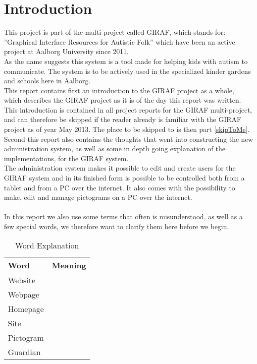\chapter{Introduction}
This project is part of the multi-project called GIRAF, which stands for: ''Graphical Interface Resources for Autistic Folk'' which have been an active project at Aalborg University since 2011.\\
As the name suggests this system is a tool made for helping kids with autism to communicate. The system is to be actively used in the specialized kinder gardens and schools here in Aalborg.\\
This report contains first an introduction to the GIRAF project as a whole, which describes the GIRAF project as it is of the day this report was written. This introduction is contained in all project reports for the GIRAF multi-project, and can therefore be skipped if the reader already is familiar with the GIRAF project as of year May 2013. The place to be skipped to is then part \vref{skipToMe}.\\
Second this report also contains the thoughts that went into constructing the new administration system, as well as some in depth going explanation of the implementations, for the GIRAF system.\\
The administration system makes it possible to edit and create users for the GIRAF system and in its finished form is possible to be controlled both from a tablet and from a PC over the internet. It also comes with the possibility to make, edit and manage pictograms on a PC over the internet.\\
\\
In this report we also use some terms that often is misunderstood, as well as a few special words, we therefore want to clarify them here before we begin.


\begin{table}[htbp]
	\centering
		\begin{tabular}{|l|l|}
			\hline
			Word & Meaning\\\hline\hline
			Website & \\\hline
			Webpage & \\\hline
			Homepage & \\\hline
			Site & \\\hline
			Pictogram & \\\hline
			Guardian & \\\hline
		\end{tabular}
	\caption{Word Explanation}
	\label{tab:WordExplanation}
\end{table}
